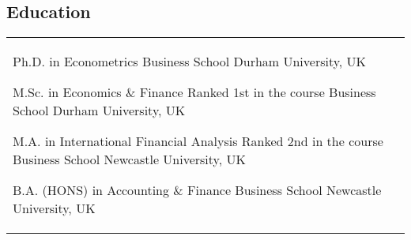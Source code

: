\documentclass[10pt]{article} %
\begin{document}
\begin{paracol}{2}

\section{Education} 





\begin{supertabular}{ll} %

	
	{Ph.D. in Econometrics} %
	{} %
	{Business School} %
	{Durham University, UK} %
	
	
	{M.Sc. in Economics \& Finance} %
	{Ranked 1st in the course} %
	{Business School} %
	{Durham University, UK} %

	
	{M.A. in International Financial Analysis} %
	{Ranked 2nd in the course} %
	{Business School} %
	{Newcastle University, UK} %
	

	{B.A. (HONS) in Accounting \& Finance} %
	{} %
	{Business School} %
	{Newcastle University, UK} %
	

\end{supertabular}
\end{paracol}
\end{document}

